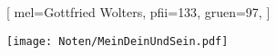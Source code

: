 [
    mel={Gottfried Wolters},
	pfii={133},
    gruen={97}, 
]

\texttt{[image: Noten/MeinDeinUndSein.pdf]}

\endsong

